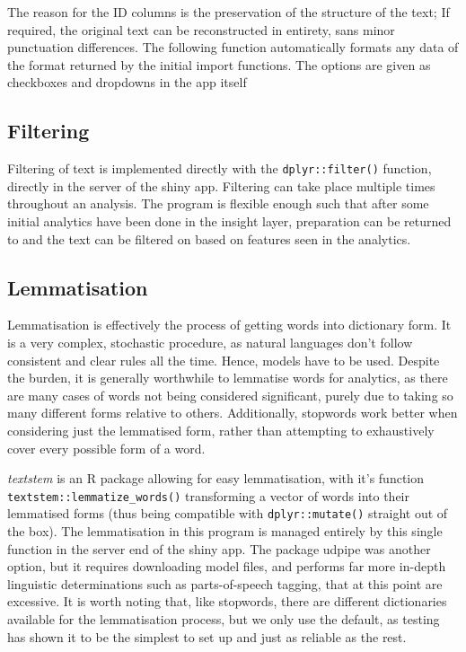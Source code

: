 \documentclass[11pt, a4paper, twoside, titlepage]{report}
\begin{document}
The reason for the ID columns is the preservation of the structure of
the text; If required, the original text can be reconstructed in
entirety, sans minor punctuation differences. The following function
automatically formats any data of the format returned by the initial
import functions. The options are given as checkboxes and dropdowns in
the app itself 

\subsection{Filtering}

Filtering of text is implemented directly with the
\texttt{dplyr::filter()} function, directly in the server of
the shiny app. Filtering can take place multiple times throughout an
analysis. The program is flexible enough such that after some initial
analytics have been done in the insight layer, preparation can be
returned to and the text can be filtered on based on features seen in
the analytics.

\subsection{Lemmatisation}

Lemmatisation is effectively the process of getting words into
dictionary form. It is a very complex, stochastic procedure, as
natural languages don't follow consistent and clear rules all the
time. Hence, models have to be used. Despite the burden, it is
generally worthwhile to lemmatise words for analytics, as there are
many cases of words not being considered significant, purely due to
taking so many different forms relative to others. Additionally,
stopwords work better when considering just the lemmatised form,
rather than attempting to exhaustively cover every possible form of a
word.

\textit{textstem} is an R package allowing for easy lemmatisation,
with it's function \texttt{textstem::lemmatize_words()}
transforming a vector of words into their lemmatised forms (thus being
compatible with \texttt{dplyr::mutate()} straight out of the
box)\autocite{rinker18}. The lemmatisation in this program is managed
entirely by this single function in the server end of the shiny app.
The package udpipe was another option, but it requires downloading
model files, and performs far more in-depth linguistic determinations
such as parts-of-speech tagging, that at this point are excessive. It
is worth noting that, like stopwords, there are different dictionaries
available for the lemmatisation process, but we only use the default,
as testing has shown it to be the simplest to set up and just as
reliable as the rest.
\end{document}
